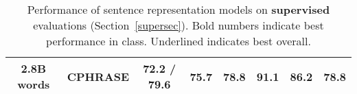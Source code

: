 \begin{table*}[ht]
\begin{adjustwidth}{-0.6cm}{}
\begin{center}
{\begin{tabular}{c|l|cccccc}
          2.8B words &CPHRASE & 72.2	 / 79.6	& 75.7	& 78.8	& 91.1	&  86.2	& 78.8 \\
           
          \hline 
        \end{tabular}

    }
      \end{center}
      \end{adjustwidth}
    \caption{\label{supervised} Performance of sentence representation models on {\bf supervised} evaluations  (Section~\ref{supersec}). Bold numbers indicate best performance in class. Underlined indicates best overall. }
  \vspace*{-4ex}
\end{table*}

\begin{table*}[ht]
  \begin{adjustwidth}{-1cm}{}
\renewcommand{\tabcolsep}{4.6pt}
\small
\newcommand{\mc}[1]{\multicolumn{1}{l|}{#1}}
  \begin{center}


\end{center}
\end{adjustwidth}
\end{table*}
